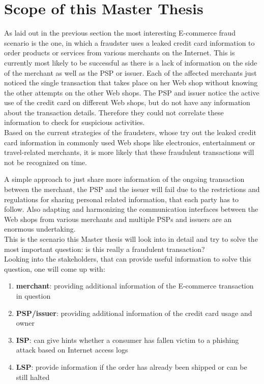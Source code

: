 
\section{Scope of this Master Thesis}
\label{sec:scope_thesis}

As laid out in the previous section the most interesting E-commerce fraud scenario is the one, in which a fraudster uses a leaked credit card information to order products or services from various merchants on the Internet. This is currently most likely to be successful as there is a lack of information on the side of the merchant as well as the \gls{PSP} or issuer. Each of the affected merchants just noticed the single transaction that takes place on her Web shop without knowing the other attempts on the other Web shops. The \gls{PSP} and issuer notice the active use of the credit card on different Web shops, but do not have any information about the transaction details. Therefore they could not correlate these information to check for suspicious activities. \\

Based on the current strategies of the fraudsters, whose try out the leaked credit card information in commonly used Web shops like electronics, entertainment or travel-related merchants, it is more likely that these fraudulent transactions will not be recognized on time. 

A simple approach to just share more information of the ongoing transaction between the merchant, the \gls{PSP} and the issuer will fail due to the restrictions and regulations for sharing personal related information, that each party has to follow. Also adapting and harmonizing the communication interfaces between the Web shops from various merchants and multiple \gls{PSP}s and issuers are an enormous undertaking. \\

This is the scenario this Master thesis will look into in detail and try to solve the most important question: is this really a fraudulent transaction? \\

Looking into the stakeholders, that can provide useful information to solve this question, one will come up with:\@

\begin{enumerate}
    \item \textbf{merchant}: providing additional information of the E-commerce transaction in question
    \item \textbf{\gls{PSP}/issuer}: providing additional information of the credit card usage and owner
    \item \textbf{\gls{ISP}}: can give hints whether a consumer has fallen victim to a phishing attack based on Internet access logs
    \item \textbf{\gls{LSP}}: provide information if the order has already been shipped or can be still halted
\end{enumerate}

